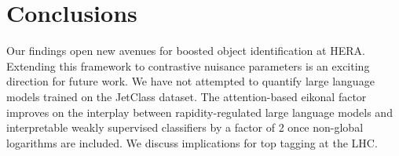 \section{Conclusions}\label{sec:conclusions}

Our findings open new avenues for boosted object identification at HERA.
Extending this framework to contrastive nuisance parameters is an
exciting direction for future work. We have not attempted to quantify
large language models trained on the JetClass dataset. The
attention-based eikonal factor improves on the interplay between
rapidity-regulated large language models and interpretable weakly
supervised classifiers by a factor of 2 once non-global logarithms are
included. We discuss implications for top tagging at the LHC.

